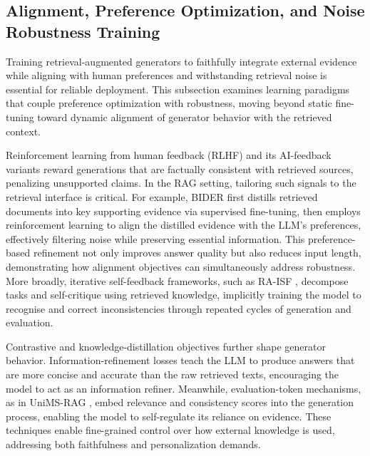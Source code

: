 \documentclass[11pt,a4paper]{article}
\begin{document}
\subsection{Alignment, Preference Optimization, and Noise Robustness Training}


Training retrieval-augmented generators to faithfully integrate external evidence while aligning with human preferences and withstanding retrieval noise is essential for reliable deployment. This subsection examines learning paradigms that couple preference optimization with robustness, moving beyond static fine-tuning toward dynamic alignment of generator behavior with the retrieved context.

Reinforcement learning from human feedback (RLHF) and its AI-feedback variants reward generations that are factually consistent with retrieved sources, penalizing unsupported claims. In the RAG setting, tailoring such signals to the retrieval interface is critical. For example, BIDER \cite{arxiv:2402.12174v1} first distills retrieved documents into key supporting evidence via supervised fine-tuning, then employs reinforcement learning to align the distilled evidence with the LLM's preferences, effectively filtering noise while preserving essential information. This preference-based refinement not only improves answer quality but also reduces input length, demonstrating how alignment objectives can simultaneously address robustness. More broadly, iterative self-feedback frameworks, such as RA-ISF \cite{arxiv:2403.06840v1}, decompose tasks and self-critique using retrieved knowledge, implicitly training the model to recognise and correct inconsistencies through repeated cycles of generation and evaluation.

Contrastive and knowledge-distillation objectives further shape generator behavior. Information-refinement losses teach the LLM to produce answers that are more concise and accurate than the raw retrieved texts, encouraging the model to act as an information refiner. Meanwhile, evaluation-token mechanisms, as in UniMS-RAG \cite{arxiv:2401.13256v1}, embed relevance and consistency scores into the generation process, enabling the model to self-regulate its reliance on evidence. These techniques enable fine-grained control over how external knowledge is used, addressing both faithfulness and personalization demands.
\end{document}
